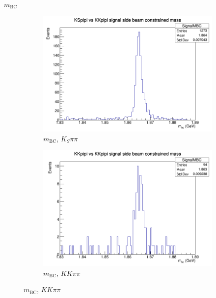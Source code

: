 \documentclass{beamer}
\begin{document}
\begin{frame}{$m_\text{BC}$}
\begin{figure}
\begin{subfigure}{0.4\textwidth}
      \includegraphics[width=\textwidth]{KSpipiSignalMBC.png}
      \caption{$m_\text{BC}$, $K_S\pi\pi$}
    \end{subfigure}%
    \begin{subfigure}{0.4\textwidth}
      \centering
      \includegraphics[width=\textwidth]{KKpipiSignalMBC.png}
      \caption{$m_\text{BC}$, $KK\pi\pi$}
    \end{subfigure}
  \end{figure}
\end{frame}
\end{document}

